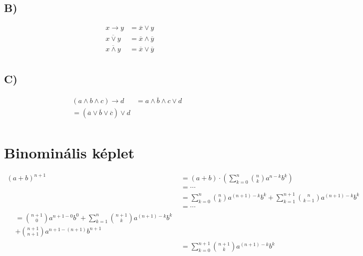 \documentclass{article}
\begin{document}
\subsection{B)}
\begin{align*}
x \rightarrow y & = \overline{x} \lor y  \\
\overline{x \lor y} & = \overline{x} \land \overline{y} \\
\overline{x \land y} & = \overline{x} \lor \overline{y} \\
\end{align*}
 \subsection{C)}
\begin{align*}
(a \land b \land c) \rightarrow d & = \overline{a \land b \land c} \lor d & \\
=(\overline{a} \lor \overline{b} \lor \overline{c}) \lor d  \\
\end{align*}

\section{Binominális képlet}
\begin{subequations}
\begin{align}
(a+b)^{n+1} &= (a+b) \cdot \left( \sum_{k=0}^n \binom{n}{k} a^{n-k}b^k \right)\\
&\nonumber =\cdots\\
&= \sum_{k=0}^n \binom{n}{k} a^{(n+1)-k}b^k + \sum_{k=1}^{n+1} \binom{n}{k-1} a^{(n+1)-k}b^{k} \\
&\nonumber =\cdots\\
\begin{split} &= \binom{n+1}{0} a^{n+1-0} b^0 + \sum_{k=1}^n \binom{n+1}{k} a^{(n+1)-k}b^k \\
&+ \binom{n+1}{n+1} a^{n+1-(n+1)} b^{n+1} \end{split} \\
&= \sum_{k=0}^{n+1} \binom{n+1}{k} a^{(n+1)-k}b^k
\end{align}
\end{subequations}
\end{document}
